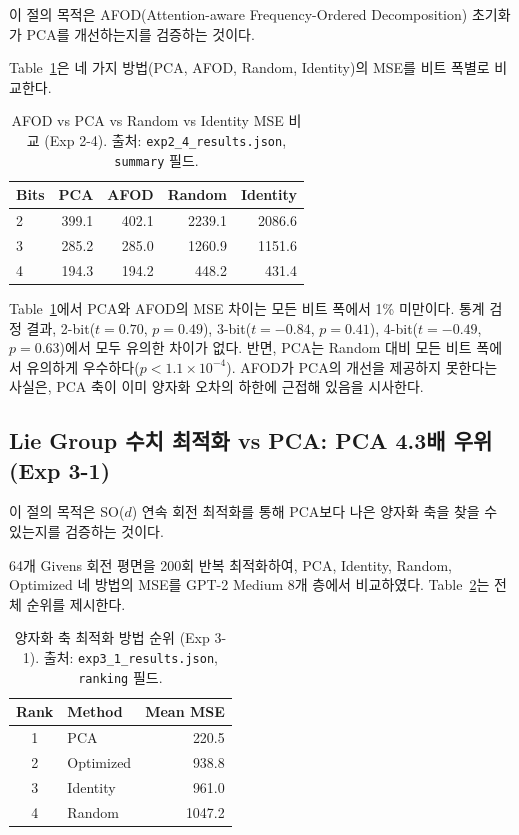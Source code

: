 \documentclass[11pt,a4paper]{article}
\begin{document}
이 절의 목적은 AFOD(Attention-aware Frequency-Ordered Decomposition) 초기화가 PCA를 개선하는지를 검증하는 것이다.

Table~\ref{tab:exp24_main}은 네 가지 방법(PCA, AFOD, Random, Identity)의 MSE를 비트 폭별로 비교한다.

\begin{table}[H]
\centering
\caption{AFOD vs PCA vs Random vs Identity MSE 비교 (Exp 2-4). 출처: \texttt{exp2\_4\_results.json}, \texttt{summary} 필드.}
\label{tab:exp24_main}
\begin{tabular}{lrrrr}
\toprule
\textbf{Bits} & \textbf{PCA} & \textbf{AFOD} & \textbf{Random} & \textbf{Identity} \\
\midrule
2 & 399.1 & 402.1 & 2239.1 & 2086.6 \\
3 & 285.2 & 285.0 & 1260.9 & 1151.6 \\
4 & 194.3 & 194.2 & 448.2 & 431.4 \\
\bottomrule
\end{tabular}
\end{table}

Table~\ref{tab:exp24_main}에서 PCA와 AFOD의 MSE 차이는 모든 비트 폭에서 1\% 미만이다.
통계 검정 결과, 2-bit($t = 0.70$, $p = 0.49$), 3-bit($t = -0.84$, $p = 0.41$), 4-bit($t = -0.49$, $p = 0.63$)에서 모두 유의한 차이가 없다.
반면, PCA는 Random 대비 모든 비트 폭에서 유의하게 우수하다($p < 1.1 \times 10^{-4}$).
AFOD가 PCA의 개선을 제공하지 못한다는 사실은, PCA 축이 이미 양자화 오차의 하한에 근접해 있음을 시사한다.

\subsection{Lie Group 수치 최적화 vs PCA: PCA 4.3배 우위 (Exp 3-1)}
\label{sec:exp31}

이 절의 목적은 SO($d$) 연속 회전 최적화를 통해 PCA보다 나은 양자화 축을 찾을 수 있는지를 검증하는 것이다.

64개 Givens 회전 평면을 200회 반복 최적화하여, PCA, Identity, Random, Optimized 네 방법의 MSE를 GPT-2 Medium 8개 층에서 비교하였다.
Table~\ref{tab:exp31_rank}는 전체 순위를 제시한다.

\begin{table}[H]
\centering
\caption{양자화 축 최적화 방법 순위 (Exp 3-1). 출처: \texttt{exp3\_1\_results.json}, \texttt{ranking} 필드.}
\label{tab:exp31_rank}
\begin{tabular}{clr}
\toprule
\textbf{Rank} & \textbf{Method} & \textbf{Mean MSE} \\
\midrule
1 & PCA & 220.5 \\
2 & Optimized & 938.8 \\
3 & Identity & 961.0 \\
4 & Random & 1047.2 \\
\bottomrule
\end{tabular}
\end{table}
\end{document}
